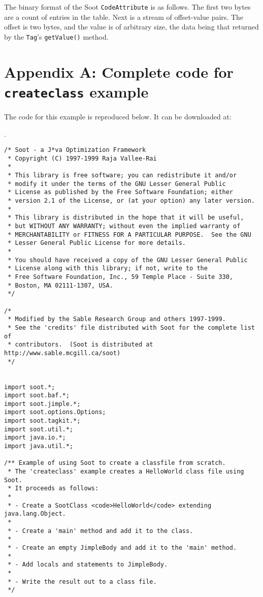 \documentclass{article}
\begin{document}
The binary format of the Soot {\tt CodeAttribute} is as follows. The first two 
bytes
are a count of entries in the table. Next is a stream of offset-value pairs. 
The offset is two bytes, and the value is of arbitrary size, the data being 
that returned by the {\tt Tag}'s {\tt getValue()} method.

\section*{Appendix A: Complete code for {\tt createclass} example}

The code for this example is reproduced below. It can be downloaded
at:

 .

\begin{verbatim}
/* Soot - a J*va Optimization Framework
 * Copyright (C) 1997-1999 Raja Vallee-Rai
 *
 * This library is free software; you can redistribute it and/or
 * modify it under the terms of the GNU Lesser General Public
 * License as published by the Free Software Foundation; either
 * version 2.1 of the License, or (at your option) any later version.
 *
 * This library is distributed in the hope that it will be useful,
 * but WITHOUT ANY WARRANTY; without even the implied warranty of
 * MERCHANTABILITY or FITNESS FOR A PARTICULAR PURPOSE.  See the GNU
 * Lesser General Public License for more details.
 *
 * You should have received a copy of the GNU Lesser General Public
 * License along with this library; if not, write to the
 * Free Software Foundation, Inc., 59 Temple Place - Suite 330,
 * Boston, MA 02111-1307, USA.
 */

/*
 * Modified by the Sable Research Group and others 1997-1999.  
 * See the 'credits' file distributed with Soot for the complete list of
 * contributors.  (Soot is distributed at http://www.sable.mcgill.ca/soot)
 */


import soot.*;
import soot.baf.*;
import soot.jimple.*;
import soot.options.Options;
import soot.tagkit.*;
import soot.util.*;
import java.io.*;
import java.util.*;

/** Example of using Soot to create a classfile from scratch.
 * The 'createclass' example creates a HelloWorld class file using Soot.
 * It proceeds as follows:
 *
 * - Create a SootClass <code>HelloWorld</code> extending java.lang.Object.
 *
 * - Create a 'main' method and add it to the class.
 *
 * - Create an empty JimpleBody and add it to the 'main' method.
 *
 * - Add locals and statements to JimpleBody.
 *
 * - Write the result out to a class file.
 */


\end{verbatim}
\end{document}
